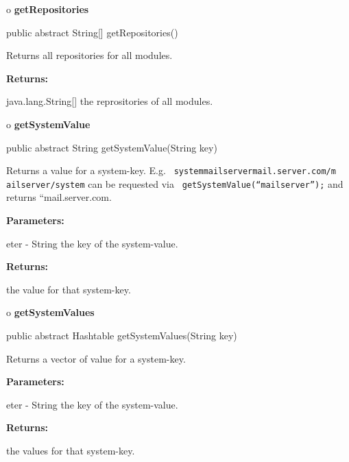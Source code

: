 o {\bf getRepositories} 

\begin{PRE}
 public abstract String[] getRepositories()
\end{PRE}

\begin{description}
\htmlDD Returns all repositories for all modules. 

\begin{description}
\item {\bf Returns:}  

java.lang.String[] the reprositories of all modules.  
\end{description}

\end{description}

o {\bf getSystemValue} 

\begin{PRE}
 public abstract String getSystemValue(String key)
\end{PRE}

\begin{description}
\htmlDD Returns a value for a system-key. E.g. {\tt
{\htmlLt}system{\htmlGt}{\htmlLt}mailserver{\htmlGt}mail.server.com{\htmlLt}/m%
ailserver{\htmlGt}{\htmlLt}/system{\htmlGt}} can be requested via {\tt
getSystemValue(``mailserver'');} and returns ``mail.server.com. 

\begin{description}
\item {\bf Parameters:}  

eter - String the key of the system-value.  
\item {\bf Returns:}  

the value for that system-key.  
\end{description}

\end{description}

o {\bf getSystemValues} 

\begin{PRE}
 public abstract Hashtable getSystemValues(String key)
\end{PRE}

\begin{description}
\htmlDD Returns a vector of value for a system-key. 

\begin{description}
\item {\bf Parameters:}  

eter - String the key of the system-value.  
\item {\bf Returns:}  

the values for that system-key.  
\end{description}

\end{description}

